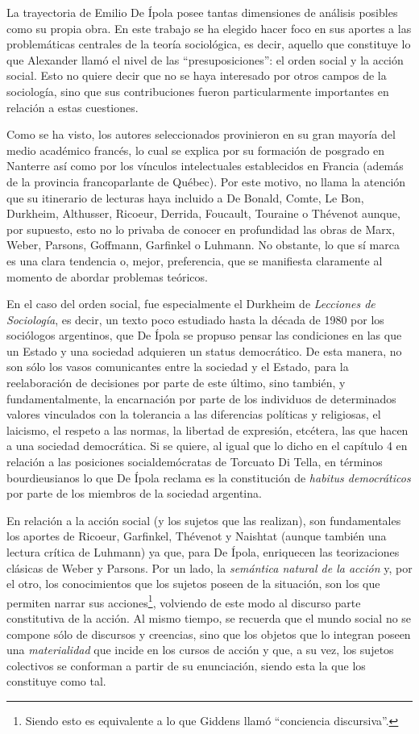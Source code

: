 La trayectoria de Emilio De Ípola posee tantas dimensiones de análisis posibles como su propia obra. En este trabajo se ha elegido hacer foco en sus aportes a las problemáticas centrales de la teoría sociológica, es decir, aquello que constituye lo que Alexander llamó el nivel de las ``presuposiciones'': el orden social y la acción social. Esto no quiere decir que no se haya interesado por otros campos de la sociología, sino que sus contribuciones fueron particularmente importantes en relación a estas cuestiones.

Como se ha visto, los autores seleccionados provinieron en su gran mayoría del medio académico francés, lo cual se explica por su formación de posgrado en Nanterre así como por los vínculos intelectuales establecidos en Francia (además de la provincia francoparlante de Québec). Por este motivo, no llama la atención que su itinerario de lecturas haya incluido a De Bonald, Comte, Le Bon, Durkheim, Althusser, Ricoeur, Derrida, Foucault, Touraine o Thévenot aunque, por supuesto, esto no lo privaba de conocer en profundidad las obras de Marx, Weber, Parsons, Goffmann, Garfinkel o Luhmann. No obstante, lo que sí marca es una clara tendencia o, mejor, preferencia, que se manifiesta claramente al momento de abordar problemas teóricos.

En el caso del orden social, fue especialmente el Durkheim de \emph{Lecciones de Sociología}, es decir, un texto poco estudiado hasta la década de 1980 por los sociólogos argentinos, que De Ípola se propuso pensar las condiciones en las que un Estado y una sociedad adquieren un status democrático. De esta manera, no son sólo los vasos comunicantes entre la sociedad y el Estado, para la reelaboración de decisiones por parte de este último, sino también, y fundamentalmente, la encarnación por parte de los individuos de determinados valores vinculados con la tolerancia a las diferencias políticas y religiosas, el laicismo, el respeto a las normas, la libertad de expresión, etcétera, las que hacen a una sociedad democrática. Si se quiere, al igual que lo dicho en el capítulo 4 en relación a las posiciones socialdemócratas de Torcuato Di Tella, en términos bourdieusianos lo que De Ípola reclama es la constitución de \emph{habitus democráticos} por parte de los miembros de la sociedad argentina.

En relación a la acción social (y los sujetos que las realizan), son fundamentales los aportes de Ricoeur, Garfinkel, Thévenot y Naishtat (aunque también una lectura crítica de Luhmann) ya que, para De Ípola, enriquecen las teorizaciones clásicas de Weber y Parsons. Por un lado, la \emph{semántica natural de la acción} y, por el otro, los conocimientos que los sujetos poseen de la situación, son los que permiten narrar sus acciones\footnote{Siendo esto es equivalente a lo que Giddens llamó ``conciencia discursiva''.}, volviendo de este modo al discurso parte constitutiva de la acción. Al mismo tiempo, se recuerda que el mundo social no se compone sólo de discursos y creencias, sino que los objetos que lo integran poseen una \emph{materialidad} que incide en los cursos de acción y que, a su vez, los sujetos colectivos se conforman a partir de su enunciación, siendo esta la que los constituye como tal.

